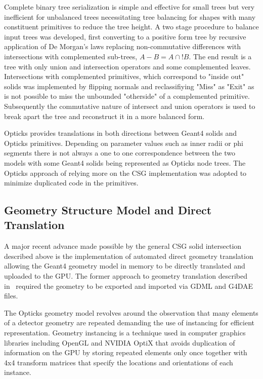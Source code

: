 \documentclass{webofc}
\begin{document}
Complete binary tree serialization is simple and effective for small trees but very inefficient 
for unbalanced trees necessitating tree balancing for shapes with many constituent primitives 
to reduce the tree height.  A two stage procedure to balance input trees was developed, 
first converting to a positive form tree by recursive application of De Morgan's laws replacing 
non-commutative differences with intersections with complemented sub-trees, $A - B  = A \cap !B $. 
The end result is a tree with only union and intersection operators and some complemented leaves. Intersections with 
complemented primitives, which correspond to "inside out" solids was implemented by flipping normals
and reclassifiying "Miss" as "Exit" as is not possible to miss the unbounded "otherside" of a 
complemented primitive.  Subsequently the commutative nature of intersect and union operators is used
to break apart the tree and reconstruct it in a more balanced form. 

Opticks provides translations in both directions between Geant4 solids and Opticks primitives.
Depending on parameter values such as inner radii or phi segments there is not always a one to one correspondence 
between the two models with some Geant4 solids being represented as Opticks node trees. The Opticks 
approach of relying more on the CSG implementation was adopted to minimize duplicated code in the primitives.
%
\subsection{Geometry Structure Model and Direct Translation}
%
A major recent advance made possible by the general CSG solid intersection 
described above is the implementation of automated direct geometry translation 
allowing the Geant4 geometry model in memory to be directly translated and uploaded to the GPU.
The former approach to geometry translation described in~\cite{chep2016} required the
geometry to be exported and imported via GDML and G4DAE files. 

The Opticks geometry model revolves around the observation that many elements of a detector 
geometry are repeated demanding the use of instancing for efficient representation.  Geometry instancing 
is a technique used in computer graphics libraries including OpenGL and NVIDIA OptiX that avoids 
duplication of information on the GPU by storing repeated elements only once together with 4x4 transform matrices 
that specify the locations and orientations of each instance.
\end{document}
